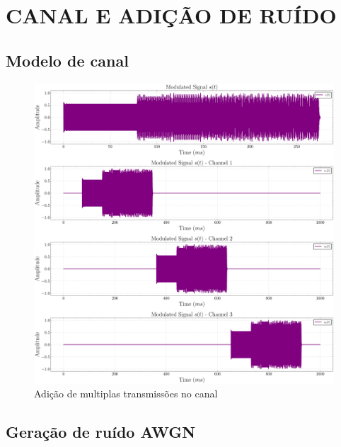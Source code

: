 \section{CANAL E ADIÇÃO DE RUÍDO}\label{sec:canal}

\subsection{Modelo de canal}\label{sec:modelo_canal}

\begin{figure}[H]
	\centering
	\caption{Adição de multiplas transmissões no canal}\label{fig:channel_time}
	\includegraphics[width=\linewidth]{assets/cap3/example_channel_time_subchannels.pdf}
\end{figure}

\subsection{Geração de ruído AWGN}\label{sec:geracao_ruido}

